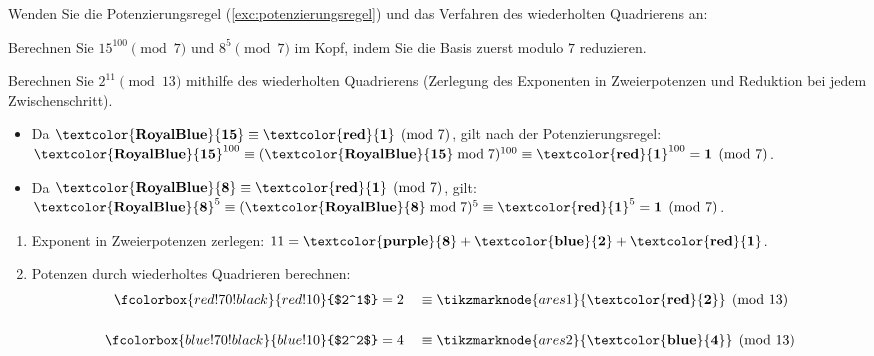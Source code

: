 \begin{myexercise}
	Wenden Sie die Potenzierungsregel (\cref{exc:potenzierungsregel}) und das Verfahren des wiederholten Quadrierens an:
	\begin{aenum}
		\item Berechnen Sie $15^{100} \pmod 7$ und $8^5 \pmod 7$ im Kopf, indem Sie die Basis zuerst modulo $7$ reduzieren.
		\item Berechnen Sie $2^{11} \pmod{13}$ mithilfe des wiederholten Quadrierens (Zerlegung des Exponenten in Zweierpotenzen und Reduktion bei jedem Zwischenschritt).
	\end{aenum}
	\begin{myanswer}
		\begin{aenum}
			\item \begin{itemize}
			          \item Da $\mathbf{\textcolor{RoyalBlue}{15}} \equiv \mathbf{\textcolor{red}{1}} \pmod 7$, gilt nach der Potenzierungsregel: $\mathbf{\textcolor{RoyalBlue}{15}}^{100} \equiv (\mathbf{\textcolor{RoyalBlue}{15}} \bmod 7)^{100} \equiv \mathbf{\textcolor{red}{1}}^{100} = \mathbf{1} \pmod 7$.
			          \item Da $\mathbf{\textcolor{RoyalBlue}{8}} \equiv \mathbf{\textcolor{red}{1}} \pmod 7$, gilt: $\mathbf{\textcolor{RoyalBlue}{8}}^5 \equiv (\mathbf{\textcolor{RoyalBlue}{8}} \bmod 7)^5 \equiv \mathbf{\textcolor{red}{1}}^5 = \mathbf{1} \pmod 7$.
			      \end{itemize}
			\item \begin{enumerate}
			          \item Exponent in Zweierpotenzen zerlegen: $11 = \mathbf{\textcolor{purple}{8}} + \mathbf{\textcolor{blue}{2}} + \mathbf{\textcolor{red}{1}}$.
			          \item Potenzen durch wiederholtes Quadrieren berechnen:
			                \begin{align*}
				                \setlength{\fboxsep}{1.5pt}\fcolorbox{red!70!black}{red!10}{$2^1$}                 & = 2                                                                                                                                                                          &  & \equiv \tikzmarknode{ares1}{\mathbf{\textcolor{red}{2}}} \pmod{13}         \\[14pt]
				                \setlength{\fboxsep}{1.5pt}\fcolorbox{blue!70!black}{blue!10}{$2^2$}               & = 4                                                                                                                                                                          &  & \equiv \tikzmarknode{ares2}{\mathbf{\textcolor{blue}{4}}} \pmod{13}        \\[18pt]

\end{align*}
\end{enumerate}
\end{aenum}
\end{myanswer}
\end{myexercise}
